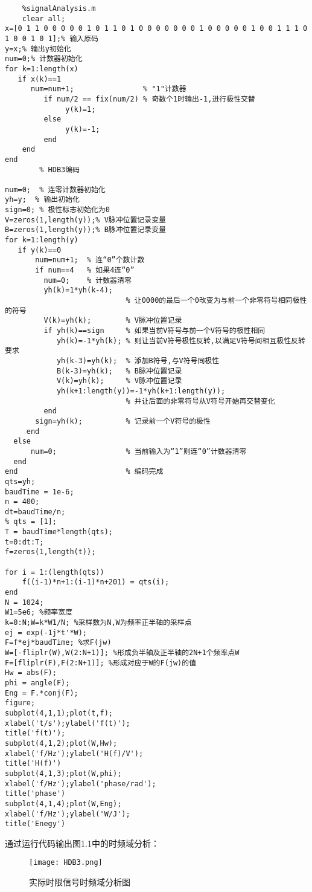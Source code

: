 \documentclass[AutoFakeBold]{LZUThesis}
\begin{document}
\begin{lstlisting}
    %signalAnalysis.m 
    clear all;
x=[0 1 1 0 0 0 0 0 1 0 1 1 0 1 0 0 0 0 0 0 0 1 0 0 0 0 0 1 0 0 1 1 1 0 1 0 0 1 0 1];% 输入原码
y=x;% 输出y初始化
num=0;% 计数器初始化
for k=1:length(x)
   if x(k)==1
      num=num+1;                % "1"计数器
         if num/2 == fix(num/2) % 奇数个1时输出-1,进行极性交替
              y(k)=1;
         else
              y(k)=-1;
         end
    end
end
        % HDB3编码

num=0;  % 连零计数器初始化
yh=y;  % 输出初始化
sign=0; % 极性标志初始化为0
V=zeros(1,length(y));% V脉冲位置记录变量 
B=zeros(1,length(y));% B脉冲位置记录变量
for k=1:length(y)
   if y(k)==0
       num=num+1;  % 连“0”个数计数
       if num==4   % 如果4连“0”
         num=0;    % 计数器清零
         yh(k)=1*yh(k-4); 
                            % 让0000的最后一个0改变为与前一个非零符号相同极性的符号
         V(k)=yh(k);        % V脉冲位置记录
         if yh(k)==sign     % 如果当前V符号与前一个V符号的极性相同
            yh(k)=-1*yh(k); % 则让当前V符号极性反转,以满足V符号间相互极性反转要求
            yh(k-3)=yh(k);  % 添加B符号,与V符号同极性
            B(k-3)=yh(k);   % B脉冲位置记录
            V(k)=yh(k);     % V脉冲位置记录
            yh(k+1:length(y))=-1*yh(k+1:length(y));
                            % 并让后面的非零符号从V符号开始再交替变化
         end
       sign=yh(k);          % 记录前一个V符号的极性
     end
  else
      num=0;                % 当前输入为“1”则连“0”计数器清零
  end
end                         % 编码完成
qts=yh;
baudTime = 1e-6;
n = 400;
dt=baudTime/n;
% qts = [1];
T = baudTime*length(qts);
t=0:dt:T;
f=zeros(1,length(t));

for i = 1:(length(qts))
    f((i-1)*n+1:(i-1)*n+201) = qts(i);
end
N = 1024;
W1=5e6; %频率宽度
k=0:N;W=k*W1/N; %采样数为N,W为频率正半轴的采样点
ej = exp(-1j*t'*W);
F=f*ej*baudTime; %求F(jw) 
W=[-fliplr(W),W(2:N+1)]; %形成负半轴及正半轴的2N+1个频率点W
F=[fliplr(F),F(2:N+1)]; %形成对应于W的F(jw)的值
Hw = abs(F);
phi = angle(F);
Eng = F.*conj(F);
figure;
subplot(4,1,1);plot(t,f);
xlabel('t/s');ylabel('f(t)');
title('f(t)');
subplot(4,1,2);plot(W,Hw);
xlabel('f/Hz');ylabel('H(f)/V');
title('H(f)')
subplot(4,1,3);plot(W,phi);
xlabel('f/Hz');ylabel('phase/rad');
title('phase')
subplot(4,1,4);plot(W,Eng);
xlabel('f/Hz');ylabel('W/J');
title('Enegy')
\end{lstlisting}

通过运行代码输出图1.1中的时频域分析：

\begin{figure}[htbp]
    \centering
    \texttt{[image: HDB3.png]}
    \caption{实际时限信号时频域分析图}
\end{figure}
\end{document}

